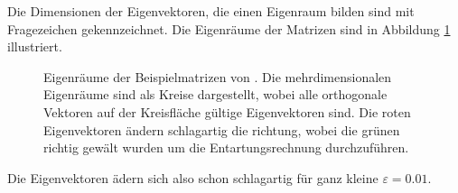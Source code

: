 Die Dimensionen der Eigenvektoren, die einen Eigenraum bilden sind mit Fragezeichen gekennzeichnet.
Die Eigenräume der Matrizen sind in Abbildung \ref{ew:fig:entartung} illustriert.

\begin{figure}
    \begin{center}
        
    \end{center}
    \caption{
        Eigenräume der Beispielmatrizen von .
        Die mehrdimensionalen Eigenräume sind als Kreise dargestellt, wobei alle orthogonale Vektoren auf der Kreisfläche gültige Eigenvektoren sind.
        Die roten Eigenvektoren ändern schlagartig die richtung, wobei die grünen richtig gewält wurden um die Entartungsrechnung durchzuführen. 
        }
    \label{ew:fig:entartung}
\end{figure}
Die Eigenvektoren ädern sich also schon schlagartig für ganz kleine $\varepsilon = 0.01$.

